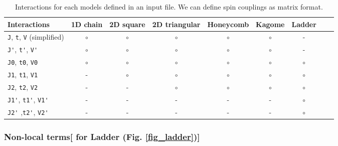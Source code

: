 \begin{table}[tbhp]
  \begin{tabular}{|l||c|c|c|c|c|c|c|c|} \hline
    Interactions & 1D chain & 2D square & 2D triangular & Honeycomb & Kagome & Ladder\\ 
    \hline 
    \hline
     \verb|J|, \verb|t|, \verb|V| (simplified) & $\circ$	 & $\circ$ & $\circ$ & $\circ$ & $\circ$ & -\\ 
     \hline
    \verb|J'|, \verb|t'|, \verb|V'| & $\circ$	 & $\circ$	& $\circ$ 	& $\circ$ 	& $\circ$ & - \\ 
    \hline
    \verb|J0|, \verb|t0|, \verb|V0| & $\circ$  & $\circ$ 	& $\circ$ 	& $\circ$ 	& $\circ$ & $\circ$\\ 
    \hline
    \verb|J1|, \verb|t1|, \verb|V1| & -         	 & $\circ$ 	& $\circ$ 	& $\circ$ 	& $\circ$ & $\circ$\\ 
    \hline
    \verb|J2|, \verb|t2|, \verb|V2|  & -         	 & -    	& $\circ$ 	& $\circ$ 	& $\circ$ & $\circ$\\
    \hline
    \verb|J1'|, \verb|t1'|, \verb|V1'| & -		 &-	 	& -		& -		& -		& $\circ$\\
    \hline
    \verb|J2'| ,\verb|t2'|, \verb|V2'|  & -		 &-	 	& -		& -		& -		& $\circ$\\ 
    \hline
\end{tabular}
   \caption{Interactions for each models defined in an input file. We can define spin couplings as matrix format.}
    \label{table_interactions}
\end{table}

\subsubsection{Non-local terms[ for Ladder (Fig. \ref{fig_ladder})]}

